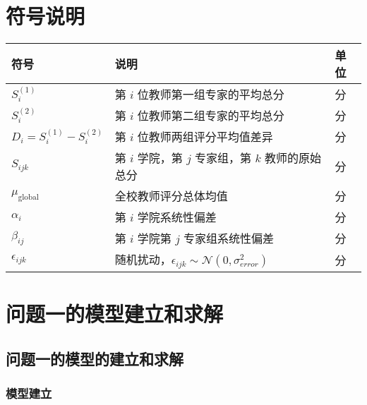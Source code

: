 \documentclass[withoutpreface,bwprint]{cumcmthesis}
\begin{document}
\section{符号说明}
\begin{table}[H]
\centering
\begin{tabularx}{\textwidth}{>{\raggedright\arraybackslash}m{3cm} >{\centering\arraybackslash}X >{\centering\arraybackslash}m{2cm}}
\toprule
\textbf{符号}    & \textbf{说明}    & \textbf{单位} \\
\midrule
$S^{(1)}_i$                    & 第 $i$ 位教师第一组专家的平均总分        & 分 \\
$S^{(2)}_i$                    & 第 $i$ 位教师第二组专家的平均总分        & 分 \\
$D_i = S^{(1)}_i - S^{(2)}_i$  & 第 $i$ 位教师两组评分平均值差异          & 分 \\
$S_{ijk}$                      & 第 $i$ 学院，第 $j$ 专家组，第 $k$ 教师的原始总分 & 分 \\
$\mu_\text{global}$            & 全校教师评分总体均值                      & 分 \\
$\alpha_i$                     & 第 $i$ 学院系统性偏差                    & 分 \\
$\beta_{ij}$                   & 第 $i$ 学院第 $j$ 专家组系统性偏差       & 分 \\
$\epsilon_{ijk}$               & 随机扰动，$\epsilon_{ijk} \sim \mathcal{N}(0, \sigma_{error}^2)$ & 分 \\
\bottomrule
\end{tabularx}
\label{tab:符号说明}
\end{table}



\section{问题一的模型建立和求解}

\subsection{问题一的模型的建立和求解}
\subsubsection{模型建立}
\end{document}
